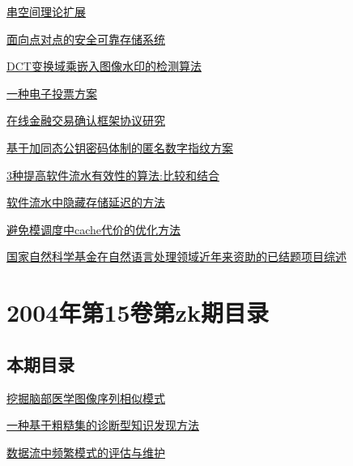 \documentclass[a4paper]{article}
\begin{document}
\href{http://www.jos.org.cn/ch/reader/download_pdf.aspx?file_no=20051011&year_id=2005&quarter_id=10&falg=1}{串空间理论扩展}

\href{http://www.jos.org.cn/ch/reader/download_pdf.aspx?file_no=20051012&year_id=2005&quarter_id=10&falg=1}{面向点对点的安全可靠存储系统}

\href{http://www.jos.org.cn/ch/reader/download_pdf.aspx?file_no=20051013&year_id=2005&quarter_id=10&falg=1}{DCT变换域乘嵌入图像水印的检测算法}

\href{http://www.jos.org.cn/ch/reader/download_pdf.aspx?file_no=20051014&year_id=2005&quarter_id=10&falg=1}{一种电子投票方案}

\href{http://www.jos.org.cn/ch/reader/download_pdf.aspx?file_no=20051015&year_id=2005&quarter_id=10&falg=1}{在线金融交易确认框架协议研究}

\href{http://www.jos.org.cn/ch/reader/download_pdf.aspx?file_no=20051016&year_id=2005&quarter_id=10&falg=1}{基于加同态公钥密码体制的匿名数字指纹方案}

\href{http://www.jos.org.cn/ch/reader/download_pdf.aspx?file_no=20051017&year_id=2005&quarter_id=10&falg=1}{3种提高软件流水有效性的算法:比较和结合}

\href{http://www.jos.org.cn/ch/reader/download_pdf.aspx?file_no=20051018&year_id=2005&quarter_id=10&falg=1}{软件流水中隐藏存储延迟的方法}

\href{http://www.jos.org.cn/ch/reader/download_pdf.aspx?file_no=20051019&year_id=2005&quarter_id=10&falg=1}{避免模调度中cache代价的优化方法}

\href{http://www.jos.org.cn/ch/reader/download_pdf.aspx?file_no=20051020&year_id=2005&quarter_id=10&falg=1}{国家自然科学基金在自然语言处理领域近年来资助的已结题项目综述}


\section{\textbf{2004年第15卷第zk期目录}}
\subsection{本期目录}
\href{http://www.jos.org.cn/ch/reader/download_pdf.aspx?file_no=2004s101&year_id=2004&quarter_id=zk&falg=1}{挖掘脑部医学图像序列相似模式}

\href{http://www.jos.org.cn/ch/reader/download_pdf.aspx?file_no=2004s102&year_id=2004&quarter_id=zk&falg=1}{一种基于粗糙集的诊断型知识发现方法}

\href{http://www.jos.org.cn/ch/reader/download_pdf.aspx?file_no=2004s103&year_id=2004&quarter_id=zk&falg=1}{数据流中频繁模式的评估与维护}
\end{document}
